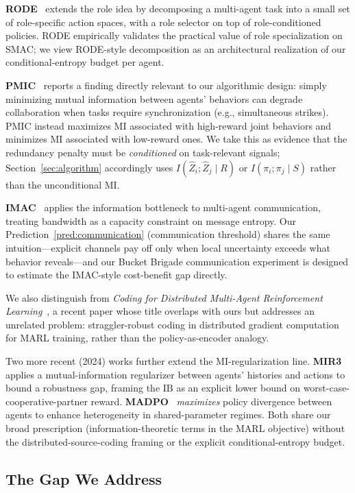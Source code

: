 \documentclass[10pt, letterpaper]{article}
\begin{document}
\textbf{RODE}~\cite{wang2021rode} extends the role idea by decomposing a multi-agent task into a small set of role-specific action spaces, with a role selector on top of role-conditioned policies. RODE empirically validates the practical value of role specialization on SMAC; we view RODE-style decomposition as an architectural realization of our conditional-entropy budget per agent.

\textbf{PMIC}~\cite{li2022pmic} reports a finding directly relevant to our algorithmic design: simply minimizing mutual information between agents' behaviors can degrade collaboration when tasks require synchronization (e.g., simultaneous strikes). PMIC instead maximizes MI associated with high-reward joint behaviors and minimizes MI associated with low-reward ones. We take this as evidence that the redundancy penalty must be \emph{conditioned} on task-relevant signals; Section~\ref{sec:algorithm} accordingly uses $I(\hat{Z}_i; \hat{Z}_j \mid R)$ or $I(\pi_i; \pi_j \mid S)$ rather than the unconditional MI.

\textbf{IMAC}~\cite{wang2020imac} applies the information bottleneck to multi-agent communication, treating bandwidth as a capacity constraint on message entropy. Our Prediction~\ref{pred:communication} (communication threshold) shares the same intuition---explicit channels pay off only when local uncertainty exceeds what behavior reveals---and our Bucket Brigade communication experiment is designed to estimate the IMAC-style cost-benefit gap directly.

We also distinguish from \emph{Coding for Distributed Multi-Agent Reinforcement Learning}~\cite{wang2021coding}, a recent paper whose title overlaps with ours but addresses an unrelated problem: straggler-robust coding in distributed gradient computation for MARL training, rather than the policy-as-encoder analogy.

Two more recent (2024) works further extend the MI-regularization line. \textbf{MIR3}~\cite{liu2024mir3} applies a mutual-information regularizer between agents' histories and actions to bound a robustness gap, framing the IB as an explicit lower bound on worst-case-cooperative-partner reward. \textbf{MADPO}~\cite{madpo2024} \emph{maximizes} policy divergence between agents to enhance heterogeneity in shared-parameter regimes. Both share our broad prescription (information-theoretic terms in the MARL objective) without the distributed-source-coding framing or the explicit conditional-entropy budget.

\subsection{The Gap We Address}
\end{document}
